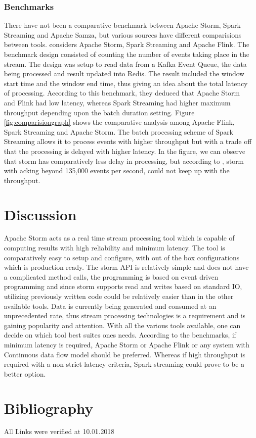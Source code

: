 \documentclass[runningheads,a4paper]{llncs}[2015/06/24]
\begin{document}
 \subsubsection{Benchmarks}
There have not been a comparative benchmark between Apache Storm, Spark Streaming and Apache Samza, but various sources have different comparisions between tools.  \cite{benchmark} considers Apache Storm, Spark Streaming and Apache Flink. The benchmark design consisted of counting the number of events taking place in the stream. The design was setup to read data from a Kafka Event Queue, the data being processed and result updated into Redis. The result included the window start time and the window end time, thus giving  an idea about the total latency of processing. According to this benchmark, they deduced that Apache Storm and Flink had low latency, whereas Spark Streaming had higher maximum throughput depending upon the batch duration setting. Figure \ref{fig:comparisiongraph} shows the comparative analysis among Apache Flink, Spark Streaming and Apache Storm. The batch processing scheme of Spark Streaming allows it to process events with higher throughput but with a trade off that the processing is delayed with higher latency. In the figure, we can observe that storm has comparatively less delay in processing, but according to \cite{benchmark}, storm with acking beyond 135,000 events per second, could not keep up with the throughput.
 
 \section{Discussion}
Apache Storm acts as a real time stream processing tool which is capable of computing results with high reliability and minimum latency. The tool is comparatively easy to setup and configure, with out of the box configurations which is production ready. The storm API is relatively simple and does not have a complicated method calls, the programming is based on event driven programming and since storm supports read and writes based on standard IO, utilizing previously written code could be relatively easier than in the other available tools. Data is currently being generated and consumed at an unprecedented rate, thus stream processing technologies is a requirement and is gaining popularity and attention. With all the various tools available, one can decide on which tool best suites ones needs. According to the benchmarks, if minimum latency is required, Apache Storm or Apache Flink or any system with Continuous data flow model should be preferred. Whereas if high throughput is required with a non strict latency criteria, Spark streaming could prove to be a better option.



\section{Bibliography}


All Links were verified at 10.01.2018
\end{document}
